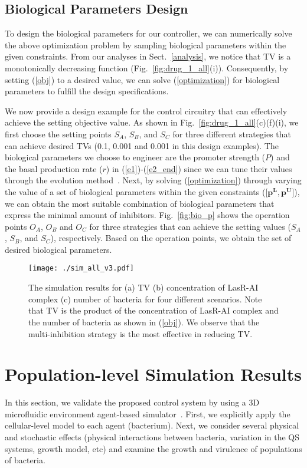 \documentclass[runningheads]{llncs}
\begin{document}
\subsection{Biological Parameters Design}
To design the biological parameters for our controller, we can numerically solve the above optimization problem by sampling biological parameters within the given constraints. From our analyses in Sect.~\ref{analysis}, we notice that TV is a monotonically decreasing function (Fig.~\ref{fig:drug_1_all}(i)). Consequently, by setting (\ref{obj}) to a desired value, we can solve (\ref{optimization}) for biological parameters to fulfill the design specifications. 

We now provide a design example for the control circuitry that can effectively achieve the setting objective value.  As shown in Fig.~\ref{fig:drug_1_all}(c)(f)(i), we first choose the setting points $S_A$, $S_B$, and $S_C$ for three different strategies that can achieve desired TVs (0.1, 0.001 and 0.001 in this design examples).  The biological parameters we choose to engineer are the promoter strength ($P$) and the basal production rate ($r$) in (\ref{e1})-(\ref{e2_end}) since we can tune their values through the evolution method~\cite{Arpino2013}. Next, by solving (\ref{optimization}) through varying the value of a set of biological parameters within the given constraints ([$\mathbf{p^L}, \mathbf{p^U}$]), we can obtain the most suitable combination of biological parameters that express the minimal amount of inhibitors. Fig.~\ref{fig:bio_p} shows the operation points $O_A$, $O_B$ and $O_C$ for three strategies that can achieve the setting values ($S_A$, $S_B$, and $S_C$), respectively. Based on the operation points, we obtain the set of desired biological parameters.  


\begin{figure}[!t]
\centering
\texttt{[image: ./sim\_all\_v3.pdf]}
\caption{ The simulation results  for  (a) TV (b) concentration of LasR-AI complex (c) number of bacteria for four different scenarios. Note that TV is the product of the concentration of LasR-AI complex and the number of bacteria as shown in (\ref{obj}). We observe that the multi-inhibition strategy is the most effective in reducing TV.   }
\label{fig:sim_all}
\end{figure}

\section{Population-level Simulation Results}
In this section, we validate the proposed control system by using a 3D microfluidic environment agent-based simulator~\cite{Wei2013}. First, we explicitly apply the cellular-level model to each agent (bacterium). Next, we consider several physical and stochastic effects (physical interactions between bacteria, variation in the QS systems, growth model, etc) and examine the growth and virulence of populations of bacteria.  
\end{document}

